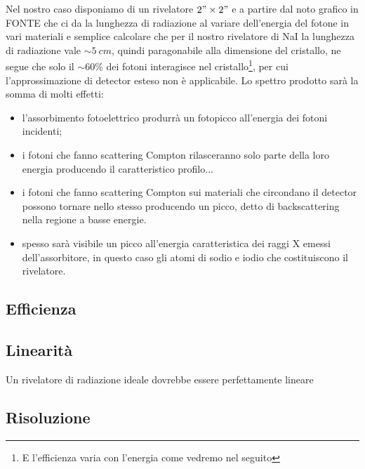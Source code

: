  Nel nostro caso disponiamo di un rivelatore $2"\times2"$ e a partire dal noto grafico in FONTE che ci da la lunghezza di radiazione al variare dell'energia del fotone in vari materiali e semplice calcolare che per il nostro rivelatore di NaI la lunghezza di radiazione vale $\sim \SI{5}{cm}$, quindi paragonabile alla dimensione del cristallo, ne segue che solo il $\sim 60\%$ dei fotoni interagisce nel cristallo\footnote{E l'efficienza varia con l'energia come vedremo nel seguito}, per cui l'approssimazione di detector esteso non è applicabile.
 Lo spettro prodotto sarà la somma di molti effetti:
 \begin{itemize}
 	\item l'assorbimento fotoelettrico produrrà un fotopicco all'energia dei fotoni incidenti;
 	\item i fotoni che fanno scattering Compton rilasceranno solo parte della loro energia producendo il caratteristico profilo...
 	\item i fotoni che fanno scattering Compton sui materiali che circondano il detector possono tornare nello stesso producendo un picco, detto di backscattering nella regione a basse energie.
 	\item spesso sarà visibile un picco all'energia caratteristica dei raggi X emessi dell'assorbitore, in questo caso gli atomi di sodio e iodio che costituiscono il rivelatore. 
 \end{itemize}
  
 
 \subsection{Efficienza}
 
 \subsection{Linearità}
 Un rivelatore di radiazione ideale dovrebbe essere perfettamente lineare 
 \subsection{Risoluzione}
 
 
 
 
 